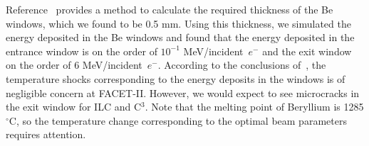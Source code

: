 \documentclass[
reprint,
nofootinbib,
amsmath, amssymb,
aps,
floatfix,
]{revtex4-2}
\begin{document}
Reference~\cite{Crystran2019} provides a method to calculate the required thickness of the Be windows, which we found to be 0.5 mm.
Using this thickness, we simulated the energy deposited in the Be windows and found that
the energy deposited in the entrance window is on the order of $10^{-1}$ MeV/incident~$e^-$ and the exit window
on the order of 6 MeV/incident~$e^-$.  
According to the conclusions of~\cite{Ammigan2019},
the temperature shocks corresponding to the energy deposits in the windows is of negligible concern at 
FACET-II.  However, we would expect to see microcracks in the exit window for ILC and C$^3$.
Note that the melting point of Beryllium is 1285 $^{\circ}$C, so the temperature change corresponding to the optimal
beam parameters requires attention.


\end{document}
